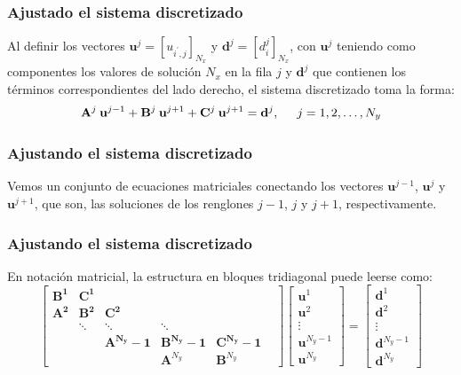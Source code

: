 \documentclass[12pt]{beamer}
\begin{document}
\begin{frame}
\frametitle{Ajustado el sistema discretizado}
Al definir los vectores $\mathbf{u}^{j} = [u_{i^{\prime}, j}]_{N_{x}}$ y $\mathbf{d}^{j} = [d_{i}^{j}]_{N_{x}}$, con $\mathbf{u}^{j}$ teniendo como componentes los valores de solución $N_{x}$ en la fila $j$ y $\mathbf{d}^{j}$ que contienen los términos correspondientes del lado derecho, el sistema discretizado toma la forma:
\begin{equation}
\mathbf{A}^{j} \: \mathbf{u}^{j-1} + \mathbf{B}^{j} \: \mathbf{u}^{j+1} +  \mathbf{C}^{j} \: \mathbf{u}^{j+1} = \mathbf{d}^{j}, \hspace{0.5cm} j = 1, 2, \ldots, N_{y}
\label{eq:ecuacion_13_17}
\end{equation}
\end{frame}
\begin{frame}
\frametitle{Ajustando el sistema discretizado}
Vemos un conjunto de ecuaciones matriciales conectando los vectores $\mathbf{u}^{j-1}$, $\mathbf{u}^{j}$ y $\mathbf{u}^{j+1}$, que son, las soluciones de los renglones $j-1$, $j$ y $j+1$, respectivamente.
\end{frame}
\begin{frame}
\frametitle{Ajustando el sistema discretizado}
En notación matricial, la estructura en bloques tridiagonal puede leerse como:
\pause
\fontsize{12}{12}\selectfont
\begin{equation}
\begin{bmatrix}
\mathbf{B^{1}} & \mathbf{C^{1}} & & & \\
\mathbf{A^{2}} & \mathbf{B^{2}} & \mathbf{C^{2}} & & \\
 & \ddots & \ddots & \ddots & \\
 & & \mathbf{A^{N_{y}}-1} & \mathbf{B^{N_{y}}-1} & \mathbf{C^{N_{y}}-1}& \\
 & & & \mathbf{A}^{N_{y}} & \mathbf{B}^{N_{y}} 
\end{bmatrix}
\begin{bmatrix}
\mathbf{u}^{1} \\
\mathbf{u}^{2} \\
\vdots \\
\mathbf{u}^{N_{y} - 1} \\
\mathbf{u}^{N_{y}}
\end{bmatrix} = 
\begin{bmatrix}
\mathbf{d}^{1} \\
\mathbf{d}^{2} \\
\vdots \\
\mathbf{d}^{N_{y} - 1} \\
\mathbf{d}^{N_{y}}
\end{bmatrix}
\label{eq:ecuacion_13_18}
\end{equation}
\end{frame}
\end{document}
